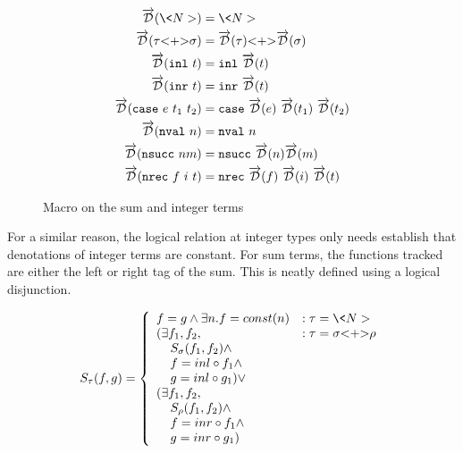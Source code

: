   \begin{figure}
    \centering
    \begin{equation*}
      \begin{split}
        \D(\<N>) &= \<N> \\
        \D(\tau \text{<+>} \sigma) &= \D(\tau) \text{<+>} \D(\sigma) \\
        \D(\inl{t}) &= \inl{\D(t)} \\
        \D(\inr{t}) &= \inr{\D(t)} \\
        \D(\case{e}{t_1}{t_2}) &= \case{\D(e)}{\D(t_1)}{\D(t_2)} \\
        \D(\nval{n}) &= \nval{n} \\
        \D(\nsucc{n}{m}) &= \nsucc{\D(n)}{\D(m)} \\
        \D(\nrec{f}{i}{t}) &= \nrec{\D(f)}{\D(i)}{\D(t)}
      \end{split}
    \end{equation*}
    \caption{Macro on the sum and integer terms}
    \label{eqn:macro_sums_prim}
  \end{figure}

  For a similar reason, the logical relation at integer types only needs establish that denotations of integer terms are constant.
  For sum terms, the functions tracked are either the left or right tag of the sum.
  This is neatly defined using a logical disjunction.

  \begin{equation}
    S_\tau(f, g) =
      \left\{
        \begin{array}{ll}
          f = g \wedge
            \exists n. f = const(n)
            & : \tau = \<N> \\
          (\exists f_1, f_2,
            & : \tau = \sigma \text{<+>} \rho \\
            \;\;\;\;S_\sigma(f_1, f_2) \wedge \\
            \;\;\;\;f = inl \circ f_1 \wedge \\
            \;\;\;\;g = inl \circ g_1) \vee \\
          (\exists f_1, f_2,\\
            \;\;\;\;S_\rho(f_1, f_2) \wedge \\
            \;\;\;\;f = inr \circ f_1 \wedge \\
            \;\;\;\;g = inr \circ g_1) \\
        \end{array}
      \right.
  \label{eqn:lr_sums_prim}
  \end{equation}

